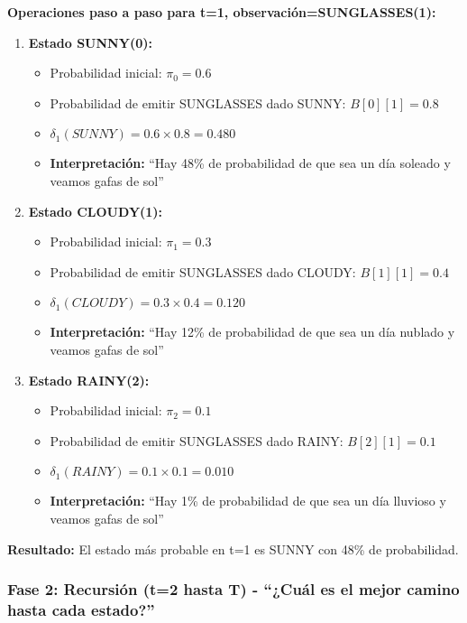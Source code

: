 \documentclass[
]{article}
\providecommand{\tightlist}{%
  \setlength{\itemsep}{0pt}\setlength{\parskip}{0pt}}
\begin{document}
\textbf{Operaciones paso a paso para t=1, observación=SUNGLASSES(1):}

\begin{enumerate}
\def\labelenumi{\arabic{enumi}.}
\tightlist
\item
  \textbf{Estado SUNNY(0):}

  \begin{itemize}
  \tightlist
  \item
    Probabilidad inicial: \(\pi_0 = 0.6\)
  \item
    Probabilidad de emitir SUNGLASSES dado SUNNY: \(B[0][1] = 0.8\)
  \item
    \(\delta_1(SUNNY) = 0.6 \times 0.8 = 0.480\)
  \item
    \textbf{Interpretación:} ``Hay 48\% de probabilidad de que sea un
    día soleado y veamos gafas de sol''
  \end{itemize}
\item
  \textbf{Estado CLOUDY(1):}

  \begin{itemize}
  \tightlist
  \item
    Probabilidad inicial: \(\pi_1 = 0.3\)
  \item
    Probabilidad de emitir SUNGLASSES dado CLOUDY: \(B[1][1] = 0.4\)
  \item
    \(\delta_1(CLOUDY) = 0.3 \times 0.4 = 0.120\)
  \item
    \textbf{Interpretación:} ``Hay 12\% de probabilidad de que sea un
    día nublado y veamos gafas de sol''
  \end{itemize}
\item
  \textbf{Estado RAINY(2):}

  \begin{itemize}
  \tightlist
  \item
    Probabilidad inicial: \(\pi_2 = 0.1\)
  \item
    Probabilidad de emitir SUNGLASSES dado RAINY: \(B[2][1] = 0.1\)
  \item
    \(\delta_1(RAINY) = 0.1 \times 0.1 = 0.010\)
  \item
    \textbf{Interpretación:} ``Hay 1\% de probabilidad de que sea un día
    lluvioso y veamos gafas de sol''
  \end{itemize}
\end{enumerate}

\textbf{Resultado:} El estado más probable en t=1 es SUNNY con 48\% de
probabilidad.

\subsubsection{Fase 2: Recursión (t=2 hasta T) - ``¿Cuál es el mejor
camino hasta cada
estado?''}\label{fase-2-recursiuxf3n-t2-hasta-t---cuuxe1l-es-el-mejor-camino-hasta-cada-estado}
\end{document}
